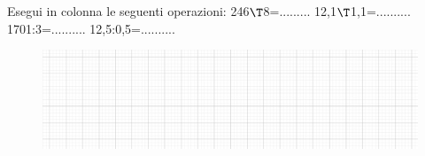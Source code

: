 \item Esegui in colonna le seguenti operazioni: 246$\T$8=......... 12,1$\T$1,1=.......... 1701:3=.......... 12,5:0,5=..........
\begin{figure}[h]
	\centering
		\includegraphics[width=13cm]{figure/quadretti.png}
\end{figure}